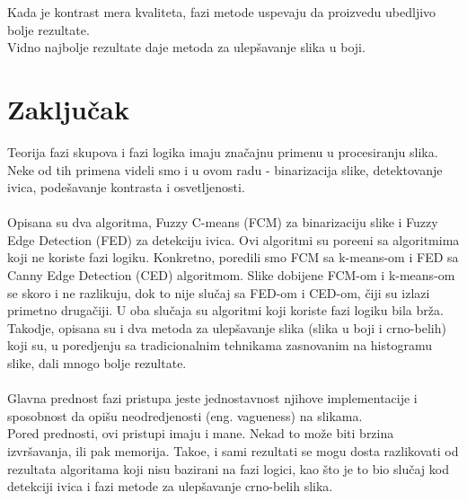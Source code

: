 \documentclass[12pt,a4paper]{article}
\theoremstyle{definition}
\theoremstyle{remark}
\theoremstyle{plain}
\begin{document}
Kada je kontrast mera kvaliteta, fazi metode uspevaju da proizvedu ubedljivo bolje rezultate. \\
Vidno najbolje rezultate daje metoda za ulep\v savanje slika u boji. 



\newpage
\section{Zaklju\v cak}
Teorija fazi skupova i fazi logika imaju zna\v cajnu primenu u procesiranju slika. Neke od tih primena videli smo i u ovom radu - binarizacija slike, detektovanje ivica, pode\v savanje kontrasta i osvetljenosti. \\ \\
Opisana su dva algoritma, Fuzzy C-means (FCM) za binarizaciju slike i Fuzzy Edge Detection (FED) za detekciju ivica. Ovi algoritmi su pore\dj eni sa algoritmima koji ne koriste fazi logiku. Konkretno, poredili smo FCM sa k-means-om i FED sa Canny Edge Detection (CED) algoritmom. Slike dobijene FCM-om i k-means-om se skoro i ne razlikuju, dok to nije slu\v caj sa FED-om i CED-om, \v ciji su izlazi primetno druga\v ciji. U oba slu\v caja su algoritmi koji koriste fazi logiku bila br\v za.
\\
Takodje, opisana su i dva metoda za ulep\v savanje slika (slika u boji i crno-belih) koji su, u poredjenju sa tradicionalnim tehnikama zasnovanim na histogramu slike, dali mnogo bolje rezultate. \\ 
\\
Glavna prednost fazi pristupa jeste jednostavnost njihove implementacije i sposobnost da opi\v su neodredjenosti (eng. vagueness) na slikama. \\ Pored prednosti, ovi pristupi imaju i mane. Nekad to mo\v ze biti brzina izvr\v savanja, ili pak memorija. Tako\dj e, i sami rezultati se mogu dosta razlikovati od rezultata algoritama koji nisu bazirani na fazi logici, kao \v sto je to bio slu\v caj kod detekciji ivica i fazi metode za ulep\v savanje crno-belih slika.

\newpage
\end{document}
